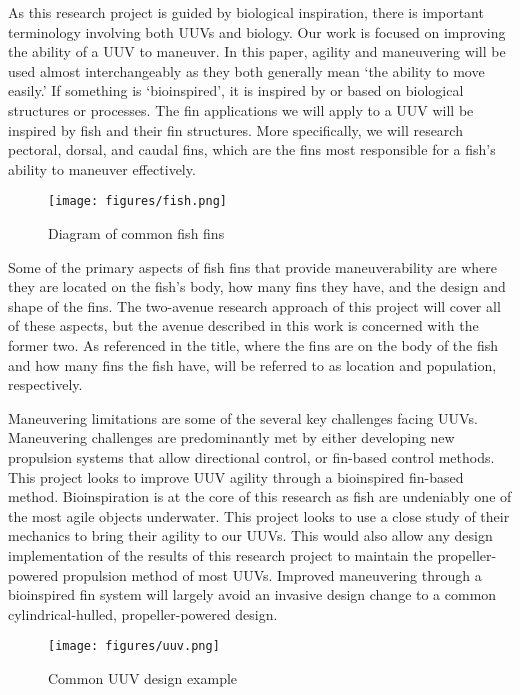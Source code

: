 \documentclass{IEEEtran}
\begin{document}
As this research project is guided by biological inspiration, there is important terminology involving both UUVs and biology. Our work is focused on improving the ability of a UUV to maneuver. In this paper, agility and maneuvering will be used almost interchangeably as they both generally mean ‘the ability to move easily.’ If something is ‘bioinspired’, it is inspired by or based on biological structures or processes. The fin applications we will apply to a UUV will be inspired by fish and their fin structures. More specifically, we will research pectoral, dorsal, and caudal fins, which are the fins most responsible for a fish’s ability to maneuver effectively.
\begin{figure}
\begin{center}
\texttt{[image: figures/fish.png]}
\end{center}
\caption{Diagram of common fish fins}
\label{fig:1}
\end{figure}

Some of the primary aspects of fish fins that provide maneuverability are where they are located on the fish’s body, how many fins they have, and the design and shape of the fins. The two-avenue research approach of this project will cover all of these aspects, but the avenue described in this work is concerned with the former two. As referenced in the title, where the fins are on the body of the fish and how many fins the fish have, will be referred to as location and population, respectively.

Maneuvering limitations are some of the several key challenges facing UUVs. Maneuvering challenges are predominantly met by either developing new propulsion systems that allow directional control, or fin-based control methods. This project looks to improve UUV agility through a bioinspired fin-based method. Bioinspiration is at the core of this research as fish are undeniably one of the most agile objects underwater. This project looks to use a close study of their mechanics to bring their agility to our UUVs. This would also allow any design implementation of the results of this research project to maintain the propeller-powered propulsion method of most UUVs. Improved maneuvering through a bioinspired fin system will largely avoid an invasive design change to a common cylindrical-hulled, propeller-powered design.
\begin{figure}
\begin{center}
\texttt{[image: figures/uuv.png]}
\end{center}
\caption{Common UUV design example}
\label{fig:2}
\end{figure}
\end{document}
